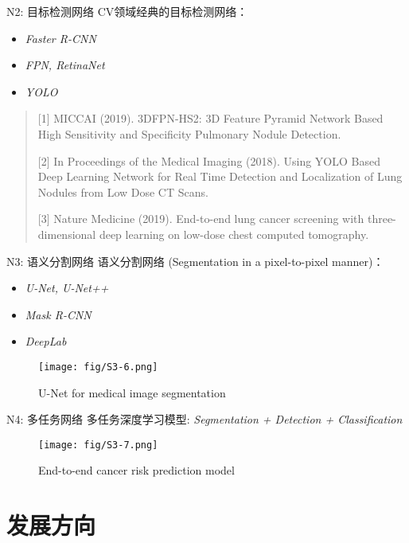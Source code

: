 \documentclass[10pt]{beamer}
\begin{document}
\begin{frame}{N2: 目标检测网络}
  CV领域经典的目标检测网络：
  \begin{itemize}
    \item \textit{Faster R-CNN}
    \item \textit{FPN, RetinaNet}
    \item \textit{YOLO}
  \end{itemize}
  \vspace{5 mm}
  \begin{quote}
    [1] MICCAI (2019). 3DFPN-HS2: 3D Feature Pyramid Network Based High Sensitivity and Specificity Pulmonary Nodule Detection. 

    [2] In Proceedings of the Medical Imaging (2018). Using YOLO Based Deep Learning Network for Real Time Detection and Localization of Lung Nodules from Low Dose CT Scans.

    [3] Nature Medicine (2019). End-to-end lung cancer screening with three-dimensional deep learning on low-dose chest computed tomography. 
  \end{quote}
\end{frame}

\begin{frame}{N3: 语义分割网络}
  语义分割网络 (Segmentation in a pixel-to-pixel manner)：
  \begin{itemize}
    \item \textit{U-Net, U-Net++}
    \item \textit{Mask R-CNN}
    \item \textit{DeepLab}
  \end{itemize}

  \begin{figure}
    \centering
    \texttt{[image: fig/S3-6.png]}
    \caption{U-Net for medical image segmentation}
  \end{figure}
\end{frame}

\begin{frame}{N4: 多任务网络}
  多任务深度学习模型: \textit{Segmentation + Detection + Classification}
  \begin{figure}
    \centering
    \texttt{[image: fig/S3-7.png]}
    \caption{End-to-end cancer risk prediction model}
  \end{figure}
\end{frame}

\section{发展方向}
\end{document}
